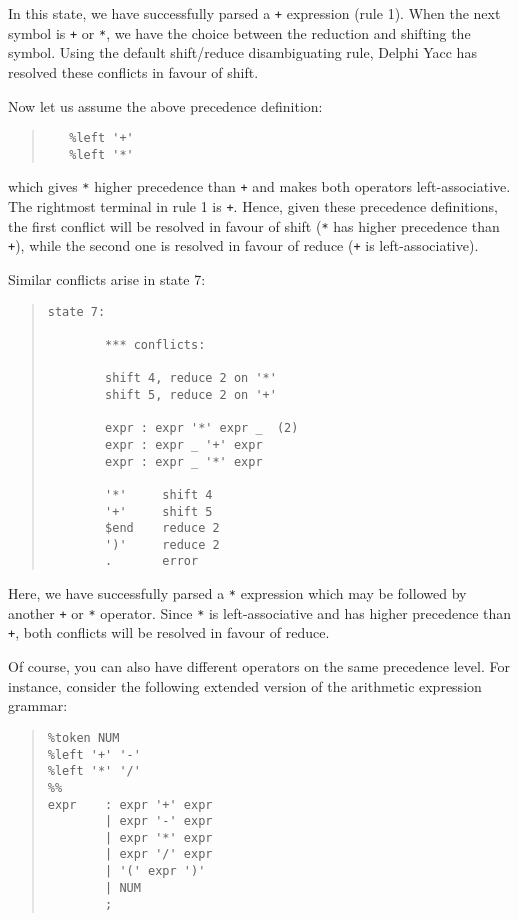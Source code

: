 \documentclass[a4paper]{article}
\begin{document}
In this state, we have successfully parsed a \verb"+" expression (rule 1).
When the next symbol is \verb"+" or \verb"*", we have the choice between the
reduction and shifting the symbol. Using the default shift/reduce
disambiguating rule, Delphi Yacc has resolved these conflicts in favour of shift.

Now let us assume the above precedence definition:
\begin{quote}\begin{verbatim}
   %left '+'
   %left '*'
\end{verbatim}\end{quote}
which gives \verb"*" higher precedence than \verb"+" and makes both operators
left-associative. The rightmost terminal in rule 1 is \verb"+". Hence, given
these precedence definitions, the first conflict will be resolved in favour
of shift (\verb"*" has higher precedence than \verb"+"), while the second one
is resolved in favour of reduce (\verb"+" is left-associative).

Similar conflicts arise in state 7:

\begin{quote}\begin{verbatim}
state 7:

        *** conflicts:

        shift 4, reduce 2 on '*'
        shift 5, reduce 2 on '+'

        expr : expr '*' expr _  (2)
        expr : expr _ '+' expr
        expr : expr _ '*' expr

        '*'     shift 4
        '+'     shift 5
        $end    reduce 2
        ')'     reduce 2
        .       error
\end{verbatim}\end{quote}

Here, we have successfully parsed a \verb"*" expression which may be followed
by another \verb"+" or \verb"*" operator. Since \verb"*" is left-associative
and has higher precedence than \verb"+", both conflicts will be resolved in
favour of reduce.

Of course, you can also have different operators on the same precedence
level. For instance, consider the following extended version of the
arithmetic expression grammar:

\begin{quote}\begin{verbatim}
%token NUM
%left '+' '-'
%left '*' '/'
%%
expr    : expr '+' expr
        | expr '-' expr
        | expr '*' expr
        | expr '/' expr
        | '(' expr ')'
        | NUM
        ;
\end{verbatim}\end{quote}
\end{document}
